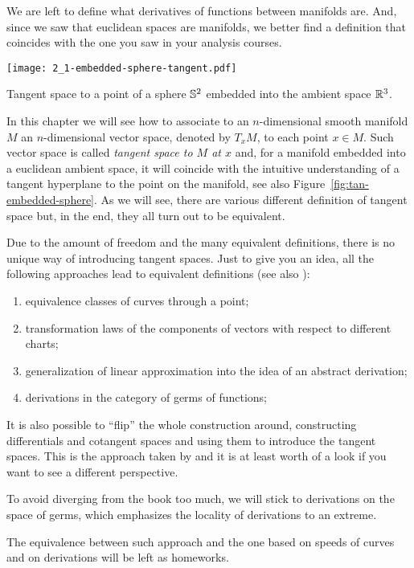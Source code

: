 
We are left to define what derivatives of functions between manifolds are.
And, since we saw that euclidean spaces are manifolds, we better find a definition that coincides with the one you saw in your analysis courses.

\begin{marginfigure}[7em]
  \texttt{[image: 2\_1-embedded-sphere-tangent.pdf]}
  \label{fig:tan-embedded-sphere}
  \caption{Tangent space to a point of a sphere $\mathbb{S}^2$ embedded into the ambient space $\mathbb{R}^3$.}
\end{marginfigure}
In this chapter we will see how to associate to an $n$-dimensional smooth manifold $M$ an $n$-dimensional vector space, denoted by $T_x M$, to each point $x\in M$.
Such vector space is called \emph{tangent space to $M$ at $x$} and, for a manifold embedded into a euclidean ambient space, it will coincide with the intuitive understanding of a tangent hyperplane to the point on the manifold, see also Figure~\ref{fig:tan-embedded-sphere}.
As we will see, there are various different definition of tangent space but, in the end, they all turn out to be equivalent.

Due to the amount of freedom and the many equivalent definitions, there is no unique way of introducing tangent spaces.
Just to give you an idea, all the following approaches lead to equivalent definitions (see also \cite{book:lee}):
\begin{enumerate}
  \item equivalence classes of curves through a point;
  \item transformation laws of the components of vectors with respect to different charts;
  \item generalization of linear approximation into the idea of an abstract derivation;
  \item derivations in the category of germs of functions;
\end{enumerate}

It is also possible to ``flip'' the whole construction around, constructing differentials and cotangent spaces and using them to introduce the tangent spaces.
This is the approach taken by \cite{lectures:hitchin} and it is at least worth of a look if you want to see a different perspective.

To avoid diverging from the book too much, we will stick to derivations on the space of germs, which emphasizes the locality of derivations to an extreme.

The equivalence between such approach and the one based on speeds of curves and on derivations will be left as homeworks.

